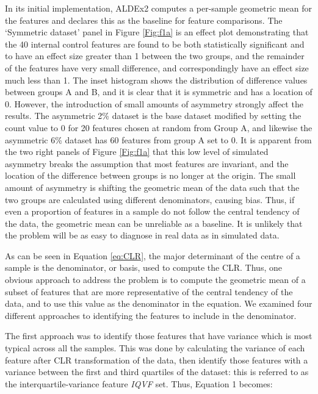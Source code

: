 \documentclass{bmcart}
\begin{document}
In its initial implementation, ALDEx2 computes a per-sample geometric mean for the features and declares this as the baseline for feature comparisons. The `Symmetric dataset' panel in Figure \ref{Fig:f1a} is an effect plot demonstrating that the 40 internal control features are found to be both statistically significant and to have an effect size greater than 1 between the two groups, and the remainder of the features have very small difference, and correspondingly have an effect size much less than 1. The inset histogram shows the distribution of difference values between groups A and B, and it is clear that it is symmetric and has a location of 0. However, the introduction of small amounts of asymmetry strongly affect the results. The asymmetric 2\% dataset is the base dataset modified by setting the count value to 0 for 20 features chosen at random from Group A, and likewise the asymmetric 6\% dataset has 60 features from group A set to 0. It is apparent from the two right panels of Figure \ref{Fig:f1a} that this low level of simulated asymmetry breaks the assumption that most features are invariant, and the location of the difference between groups is no longer at the origin.  The small amount of asymmetry is shifting the geometric mean of the data such that the two groups are calculated using different denominators, causing bias. Thus, if even a proportion of features in a sample  do not follow the central tendency of the data, the geometric mean can be unreliable as a baseline. It is unlikely that the problem will be as easy to diagnose in real data as in simulated data. 

As can be seen in Equation \ref{eq:CLR}, the major determinant of the centre of a sample is the denominator, or basis, used to compute the CLR. Thus, one obvious approach to address the problem is to compute the geometric mean of a subset of features that are more representative of the central tendency of the data, and to use this value as the denominator in the equation. We  examined four different approaches to identifying the features to include in the denominator. 

The first approach was to identify those features that have variance which is most typical across all the samples. This was  done by calculating the variance of each feature after CLR transformation of the data, then identify  those features with a variance between the first and third quartiles of the dataset: this is referred to as the interquartile-variance feature \textit{IQVF} set. Thus, Equation 1 becomes:
\end{document}
